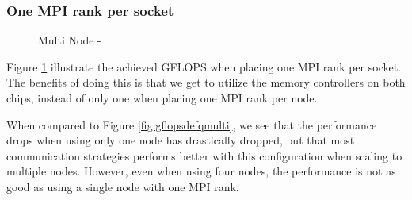 \subsubsection{One MPI rank per socket}

\begin{figure}[H]
    \centering
    \caption{Multi Node - }
    \label{fig:gflopsdefqmpimulti}
\end{figure}


Figure \ref{fig:gflopsdefqmpimulti} illustrate the achieved GFLOPS when placing one MPI rank per socket. The benefits of doing this is that we get to utilize the memory controllers on both chips, instead of only one when placing one MPI rank per node.
\medskip

When compared to Figure \ref{fig:gflopsdefqmulti}, we see that the performance drops when using only one node has drastically dropped, but that most communication strategies performs better with this configuration when scaling to multiple nodes. However, even when using four nodes, the performance is not as good as using a single node with one MPI rank.

\begin{figure}[H]
    \centering
    \caption{}
    \label{fig:tcommdefqmpimulti}
\end{figure}


\begin{figure}[H]
    \centering
    \caption{}
    \label{}
\end{figure}
